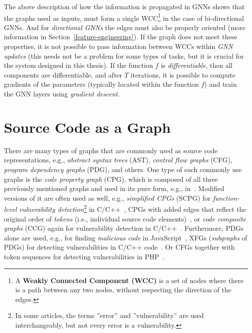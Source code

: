 The above description of how the information is propagated in GNNs shows that the graphs used as inputs, must form a single WCC\footnote{A \textbf{Weakly Connected Component (WCC)} is a set of nodes where there is a path between any two nodes, without respecting the direction of the edges.} in the case of bi-directional GNNs. And for \textit{directional GNNs} the edges must also be properly oriented (more information in Section~\ref{feature-engineering}). If the graph does not meet these properties, it is not possible to pass information between WCCs within \textit{GNN updates} (this needs not be a problem for some types of tasks, but it is crucial for the system designed in this thesis). If the function $\mathit{f}$ is \textit{differentiable}, then all components are differentiable, and after $\mathit{T}$ iterations, it is possible to compute gradients of the parameters (typically located within the function $\mathit{f}$) and train the GNN layers using \textit{gradient descent}.


\section{Source Code as a Graph}
\label{cpg}

There are many types of graphs that are commonly used as source code representations, e.g., \textit{abstract syntax trees} (AST), \textit{control flow graphs} (CFG), \textit{program dependency graphs} (PDG), and others. One type of such commonly use graphs is the \textit{code property graph} (CPG), which is composed of all three previously mentioned graphs and used in its pure form, e.g., in~\cite{USE-CPG-liu2020retrieval, GNN4-IBM-suneja2020learning}. Modified versions of it are often used as well, e.g., \textit{simplified CPGs} (SCPG) for \textit{function-level vulnerability detection}\footnote{In some articles, the terms ''error'' and ''vulnerability'' are used interchangeably, but not every error is a vulnerability.} in C/C++~\cite{SCPG-wu2021vulnerability}, CPGs with added edges that reflect the original order of \textit{tokens} (i.e., individual source code elements)~\cite{GNN2-zhou2019devign}, or \textit{code composite graphs} (CCG) again for vulnerability detection in C/C++~\cite{GNN1-cao2021bgnn4vd}. Furthermore, PDGs alone are used, e.g., for finding \textit{malicious code} in JavaScript~\cite{GNN8-RNN-fang2022jstrong}, XFGs (\textit{subgraphs} of PDGs) for detecting vulnerabilities in C/C++ code~\cite{GNN3-cheng2021deepwukong}. Or CFGs together with token sequences for detecting vulnerabilities in PHP~\cite{GNN7-RNN-rabheru2020hybrid}.

